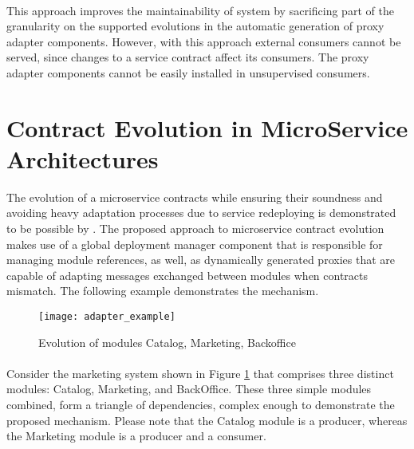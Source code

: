 \paragraph{}

This approach improves the maintainability of system by sacrificing part of the granularity on the supported evolutions in the automatic generation of proxy adapter components.
However, with this approach external consumers cannot be served, since changes to a service contract affect its consumers.
The proxy adapter components cannot be easily installed in unsupervised consumers.

\section{Contract Evolution in MicroService Architectures} %
\label{sec:contract_evolution_in_microservice_architectures}

The evolution of a microservice contracts while ensuring their soundness and
avoiding heavy adaptation processes due to service redeploying is demonstrated to be possible by \citeauthor{seco2020robust} \cite{seco2020robust}.
The proposed approach to microservice contract evolution \cite{seco2020robust} makes use of a global deployment manager component that is responsible for managing module references,
as well, as dynamically generated proxies that are capable of adapting messages exchanged between modules when contracts mismatch.
The following example demonstrates the mechanism.

\begin{figure}[htbp]
    \centering
    \texttt{[image: adapter\_example]}
    \caption{Evolution of modules Catalog, Marketing, Backoffice \cite{seco2020robust}}
    \label{fig:evolution_of_modules}
\end{figure}

\paragraph{}

Consider the marketing system shown in Figure \ref{fig:evolution_of_modules} that comprises three distinct modules: Catalog, Marketing, and BackOffice.
These three simple modules combined, form a triangle of dependencies, complex enough to demonstrate the proposed mechanism.
Please note that the Catalog module is a producer, whereas the Marketing module is a producer and a consumer.

\paragraph{}

